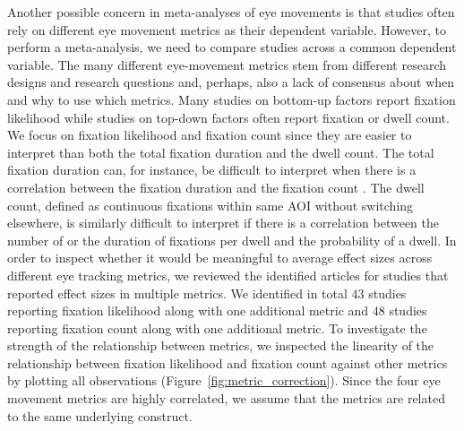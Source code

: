 \documentclass[english,natbib,man,floatsintext]{apa6}
\begin{document}
Another possible concern in meta-analyses of eye movements is that studies often rely on different eye movement metrics as their dependent variable. However, to perform a meta-analysis, we need to compare studies across a common dependent variable. The many different eye-movement metrics stem from different research designs and research questions and, perhaps, also a lack of consensus about when and why to use which metrics. Many studies on bottom-up factors report fixation likelihood while studies on top-down factors often report fixation or dwell count. We focus on fixation likelihood and fixation count since they are easier to interpret than both the total fixation duration and the dwell count. The total fixation duration can, for instance, be difficult to interpret when there is a correlation between the fixation duration and the fixation count \citep{orquin2018a,orquin2019a}. The dwell count, defined as continuous fixations within same AOI without switching elsewhere, is similarly difficult to interpret if there is a correlation between the number of or the duration of fixations per dwell and the probability of a dwell. In order to inspect whether it would be meaningful to average effect sizes across different eye tracking metrics, we reviewed the identified articles for studies that reported effect sizes in multiple metrics. We identified in total $43$ studies reporting fixation likelihood along with one additional metric and $48$ studies reporting fixation count along with one additional metric. To investigate the strength of the relationship between metrics, we inspected the linearity of the relationship between fixation likelihood and fixation count against other metrics by plotting all observations (Figure~\ref{fig:metric_correction}). Since the four eye movement metrics are highly correlated, we assume that the metrics are related to the same underlying construct. 
\end{document}
